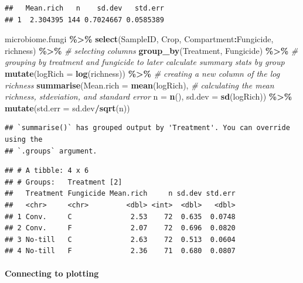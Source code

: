 \documentclass[
]{article}
\newenvironment{Shaded}{\begin{snugshade}}{\end{snugshade}}
\newcommand{\AttributeTok}[1]{\textcolor[rgb]{0.13,0.29,0.53}{#1}}
\newcommand{\CommentTok}[1]{\textcolor[rgb]{0.56,0.35,0.01}{\textit{#1}}}
\newcommand{\FunctionTok}[1]{\textcolor[rgb]{0.13,0.29,0.53}{\textbf{#1}}}
\newcommand{\NormalTok}[1]{#1}
\newcommand{\SpecialCharTok}[1]{\textcolor[rgb]{0.81,0.36,0.00}{\textbf{#1}}}
\begin{document}
\begin{verbatim}
##   Mean.rich   n    sd.dev   std.err
## 1  2.304395 144 0.7024667 0.0585389
\end{verbatim}

\begin{Shaded}
\begin{Highlighting}[]
\NormalTok{microbiome.fungi }\SpecialCharTok{\%\textgreater{}\%}
  \FunctionTok{select}\NormalTok{(SampleID, Crop, Compartment}\SpecialCharTok{:}\NormalTok{Fungicide, richness) }\SpecialCharTok{\%\textgreater{}\%} \CommentTok{\# selecting columns}
  \FunctionTok{group\_by}\NormalTok{(Treatment, Fungicide) }\SpecialCharTok{\%\textgreater{}\%} \CommentTok{\# grouping by treatment and fungicide to later calculate summary stats by group}
  \FunctionTok{mutate}\NormalTok{(}\AttributeTok{logRich =} \FunctionTok{log}\NormalTok{(richness)) }\SpecialCharTok{\%\textgreater{}\%} \CommentTok{\# creating a new column of the log richness}
  \FunctionTok{summarise}\NormalTok{(}\AttributeTok{Mean.rich =} \FunctionTok{mean}\NormalTok{(logRich), }\CommentTok{\# calculating the mean richness, stdeviation, and standard error}
            \AttributeTok{n =} \FunctionTok{n}\NormalTok{(), }
            \AttributeTok{sd.dev =} \FunctionTok{sd}\NormalTok{(logRich)) }\SpecialCharTok{\%\textgreater{}\%}
  \FunctionTok{mutate}\NormalTok{(}\AttributeTok{std.err =}\NormalTok{ sd.dev}\SpecialCharTok{/}\FunctionTok{sqrt}\NormalTok{(n))}
\end{Highlighting}
\end{Shaded}

\begin{verbatim}
## `summarise()` has grouped output by 'Treatment'. You can override using the
## `.groups` argument.
\end{verbatim}

\begin{verbatim}
## # A tibble: 4 x 6
## # Groups:   Treatment [2]
##   Treatment Fungicide Mean.rich     n sd.dev std.err
##   <chr>     <chr>         <dbl> <int>  <dbl>   <dbl>
## 1 Conv.     C              2.53    72  0.635  0.0748
## 2 Conv.     F              2.07    72  0.696  0.0820
## 3 No-till   C              2.63    72  0.513  0.0604
## 4 No-till   F              2.36    71  0.680  0.0807
\end{verbatim}

\paragraph{Connecting to plotting}\label{connecting-to-plotting}
\end{document}
